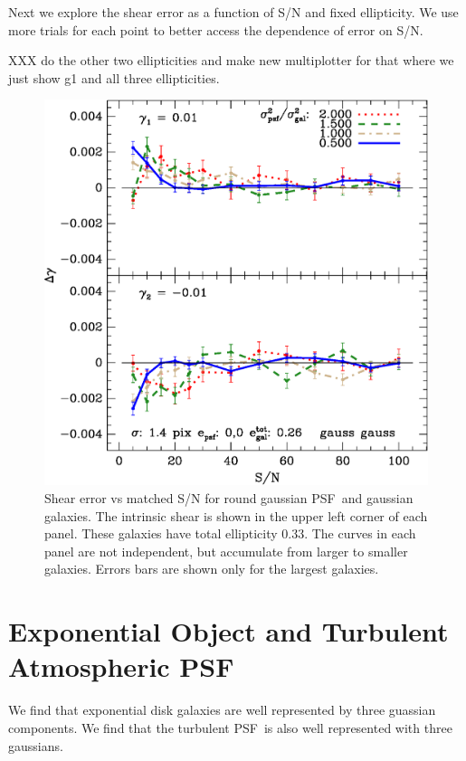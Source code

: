 \documentclass[10pt,preprint]{aastex}
\newcommand{\psf}{PSF}
\begin{document}
Next we explore the shear error as a function of S/N and fixed ellipticity.  We
use more trials for each point to better access the dependence of error on S/N.

XXX do the other two ellipticities and make new multiplotter for that
where we just show g1 and all three ellipticities.

\begin{figure}[h] \centering
\includegraphics[scale=0.7]{figures/gmix-fit-gg05r01-yr-0.005-0.005-diff.eps}

 \caption{Shear error vs matched S/N for round gaussian \psf\ and gaussian
 galaxies. The intrinsic shear is shown in the upper left corner of each panel.
 These galaxies have total ellipticity 0.33.  The curves in each panel are not
 independent, but accumulate from larger to smaller galaxies.  Errors bars are
 shown only for the largest galaxies.  \label{fig:gg05r01}}

\end{figure}


\section{Exponential Object and Turbulent Atmospheric \psf}

We find that exponential disk galaxies are well represented by three guassian
components.  We find that the turbulent \psf\ is also well represented with three
gaussians.
\end{document}
